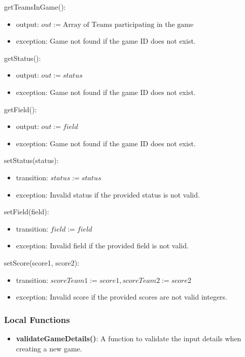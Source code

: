 \documentclass[12pt, titlepage]{article}
\begin{document}
\noindent getTeamsInGame():
\begin{itemize}
\item output: $out := \text{Array of Teams participating in the game}$
\item exception: Game not found if the game ID does not exist.
\end{itemize}

\noindent getStatus():
\begin{itemize}
\item output: $out := status$
\item exception: Game not found if the game ID does not exist.
\end{itemize}

\noindent getField():
\begin{itemize}
\item output: $out := field$
\item exception: Game not found if the game ID does not exist.
\end{itemize}

\noindent setStatus(status):
\begin{itemize}
\item transition: $status := status$
\item exception: Invalid status if the provided status is not valid.
\end{itemize}

\noindent setField(field):
\begin{itemize}
\item transition: $field := field$
\item exception: Invalid field if the provided field is not valid.
\end{itemize}

\noindent setScore(score1, score2):
\begin{itemize}
\item transition: $scoreTeam1 := score1, scoreTeam2 := score2$
\item exception: Invalid score if the provided scores are not valid integers.
\end{itemize}

\subsubsection{Local Functions}
\begin{itemize}
  \item \textbf{validateGameDetails()}: A function to validate the input details when creating a new game.
\end{itemize}
\end{document}

